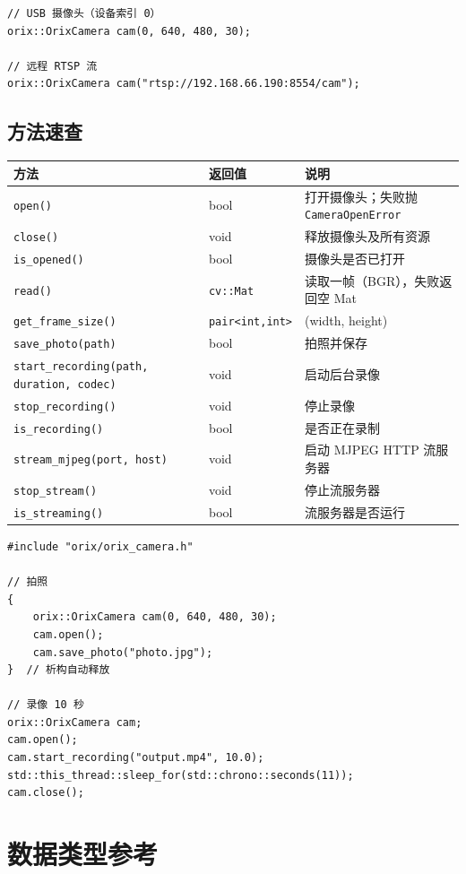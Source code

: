 \documentclass[a4paper,11pt,openany]{book}
\begin{document}
\begin{lstlisting}[style=cpp]
// USB 摄像头（设备索引 0）
orix::OrixCamera cam(0, 640, 480, 30);

// 远程 RTSP 流
orix::OrixCamera cam("rtsp://192.168.66.190:8554/cam");
\end{lstlisting}

\subsection{方法速查}

\begin{longtable}{lll}
\toprule
方法 & 返回值 & 说明 \\
\midrule
\endhead
\texttt{open()} & bool & 打开摄像头；失败抛 \texttt{CameraOpenError} \\
\texttt{close()} & void & 释放摄像头及所有资源 \\
\texttt{is\_opened()} & bool & 摄像头是否已打开 \\
\texttt{read()} & \texttt{cv::Mat} & 读取一帧（BGR），失败返回空 Mat \\
\texttt{get\_frame\_size()} & \texttt{pair<int,int>} & (width, height) \\
\texttt{save\_photo(path)} & bool & 拍照并保存 \\
\texttt{start\_recording(path, duration, codec)} & void & 启动后台录像 \\
\texttt{stop\_recording()} & void & 停止录像 \\
\texttt{is\_recording()} & bool & 是否正在录制 \\
\texttt{stream\_mjpeg(port, host)} & void & 启动 MJPEG HTTP 流服务器 \\
\texttt{stop\_stream()} & void & 停止流服务器 \\
\texttt{is\_streaming()} & bool & 流服务器是否运行 \\
\bottomrule
\end{longtable}

\begin{lstlisting}[style=cpp]
#include "orix/orix_camera.h"

// 拍照
{
    orix::OrixCamera cam(0, 640, 480, 30);
    cam.open();
    cam.save_photo("photo.jpg");
}  // 析构自动释放

// 录像 10 秒
orix::OrixCamera cam;
cam.open();
cam.start_recording("output.mp4", 10.0);
std::this_thread::sleep_for(std::chrono::seconds(11));
cam.close();
\end{lstlisting}

\section{数据类型参考}
\end{document}
